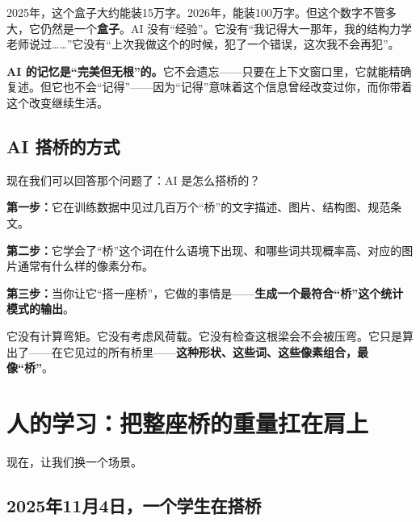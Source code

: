 2025年，这个盒子大约能装15万字。2026年，能装100万字。但这个数字不管多大，它仍然是一个\textbf{盒子}。AI 没有“经验”。它没有“我记得大一那年，我的结构力学老师说过\ldots\ldots”它没有“上次我做这个的时候，犯了一个错误，这次我不会再犯”。

\begin{insight}
\label{insight:chap1-2}

\textbf{AI 的记忆是“完美但无根”的。}它不会遗忘——只要在上下文窗口里，它就能精确复述。但它也不会“记得”——因为“记得”意味着这个信息曾经改变过你，而你带着这个改变继续生活。
\end{insight}

\subsection{AI 搭桥的方式}

现在我们可以回答那个问题了：AI 是怎么搭桥的？

\textbf{第一步：}它在训练数据中见过几百万个“桥”的文字描述、图片、结构图、规范条文。

\textbf{第二步：}它学会了“桥”这个词在什么语境下出现、和哪些词共现概率高、对应的图片通常有什么样的像素分布。

\textbf{第三步：}当你让它“搭一座桥”，它做的事情是——\textbf{生成一个最符合“桥”这个统计模式的输出}。

它没有计算弯矩。它没有考虑风荷载。它没有检查这根梁会不会被压弯。它只是算出了——在它见过的所有桥里——\textbf{这种形状、这些词、这些像素组合，最像“桥”}。

\begin{center}
\end{center}

\section{人的学习：把整座桥的重量扛在肩上}

现在，让我们换一个场景。

\subsection{2025年11月4日，一个学生在搭桥}


